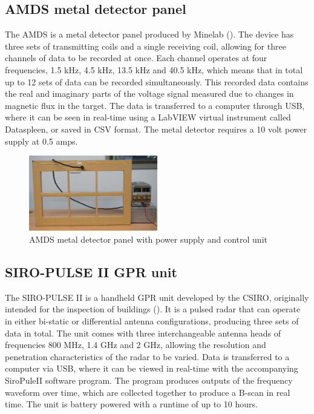 \documentclass[main.tex]{subfiles}
\begin{document}
\subsection{AMDS metal detector panel}
The AMDS is a metal detector panel produced by Minelab (). The device has three sets of transmitting coils and a single receiving coil, allowing for three channels of data to be recorded at once. Each channel operates at four frequencies, 1.5 kHz, 4.5 kHz, 13.5 kHz and 40.5 kHz, which means that in total up to 12 sets of data can be recorded simultaneously. This recorded data contains the real and imaginary parts of the voltage signal measured due to changes in magnetic flux in the target. The data is transferred to a computer through USB, where it can be seen in real-time using a LabVIEW virtual instrument called Dataspleen, or saved in CSV format. The metal detector requires a 10 volt power supply at 0.5 amps.  

\begin{figure}[ht]
\includegraphics[width=0.5\textwidth]{3-ConceptDesign/AMDS.JPG}
\centering
\caption{AMDS metal detector panel with power supply and control unit} 
\end{figure}

\subsection{SIRO-PULSE II GPR unit}
The SIRO-PULSE II is a handheld GPR unit developed by the CSIRO, originally intended for the inspection of buildings (). It is a pulsed radar that can operate in either bi-static or differential antenna configurations, producing three sets of data in total. The unit comes with three interchangeable antenna heads of frequencies 800 MHz, 1.4 GHz and 2 GHz, allowing the resolution and penetration characteristics of the radar to be varied. Data is transferred to a computer via USB, where it can be viewed in real-time with the accompanying SiroPuleII software program. The program produces outputs of the frequency waveform over time, which are collected together to produce a B-scan in real time. The unit is battery powered with a runtime of up to 10 hours. 
\end{document}
